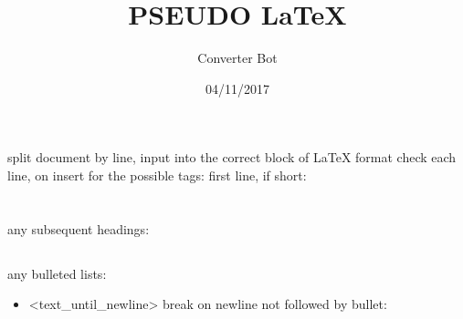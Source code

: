 \documentclass{article}
\begin{document}
\title{PSEUDO LaTeX}
\author{Converter Bot}
\date{04/11/2017}

\maketitle




split document by line,
input into the correct block of LaTeX format
check each line, on insert for the possible tags:
    first line, if short: \section*{}
    any subsequent headings: \subsection*{}

    any bulleted lists: \begin{itemize}
    for each bullet: \item <text_until_newline>
    break on newline not followed by bullet: \end{itemize}
\end{document}

